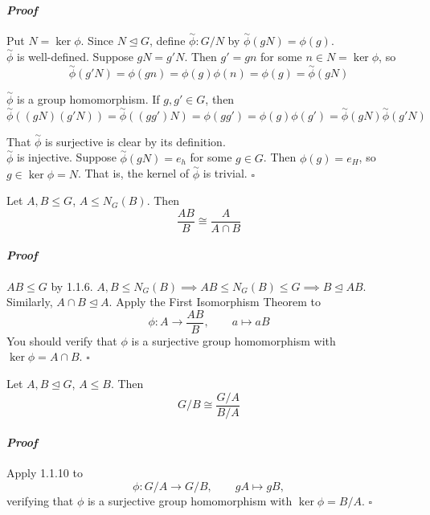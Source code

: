 \documentclass[11pt]{book}
\theoremstyle{definition}   \newtheorem{defn}[counter]{Definition} %
\newcommand{\nsg}{\mathrel{\unlhd}}   \newcommand{\ind}{\parindent24pt}   \newcommand{\vn}{\varnothing}
\DeclareMathOperator{\ra}{\rightarrow}   \DeclareMathOperator{\Poly}{\mathbf{P}}   \DeclareMathOperator{\spn}{\textnormal{span}}   \DeclareMathOperator{\aut}{\textnormal{Aut}}
\newenvironment{prf}{\paragraph{\textit{Proof}}}{\hfill$\square$}
\newcommand{\vs}{\vspace{8pt}}
\numberwithin{counter}{chapter}
\begin{document}
\begin{prf}
Put $N = \ker \phi$. Since $N \nsg G$, define $\overset{\sim}{\phi} : G/ N$ by $\overset{\sim}{\phi} (gN) = \phi(g)$. \\

$\overset{\sim}{\phi}$ is well-defined. Suppose $gN = g'N$. Then $g' = gn$ for some $n \in N = \ker \phi$, so
	\[\overset{\sim}{\phi}(g'N) = \phi(gn) = \phi(g)\phi(n) = \phi(g) = \overset{\sim}{\phi}(gN) \]

$\overset{\sim}{\phi}$ is a group homomorphism. If $g,g' \in G$, then
	\[\overset{\sim}{\phi}((gN)(g'N)) = \overset{\sim}{\phi}((gg')N) = \phi(gg') = \phi(g)\phi(g') = \overset{\sim}{\phi}(gN) \overset{\sim}{\phi}(g'N) \]

That $\overset{\sim}{\phi}$ is surjective is clear by its definition. \\

$\overset{\sim}{\phi}$ is injective. Suppose $\overset{\sim}{\phi}(gN) = e_h$ for some $g \in G$. Then $\phi(g) = e_H$, so $g \in \ker \phi = N$. That is, the kernel of $\overset{\sim}{\phi}$ is trivial.
\end{prf}

\vs

\begin{corollary}
Let $A,B \leq G$, $A \leq N_G(B)$. Then
	\[\frac{AB}{B} \cong \frac{A}{A\cap B} \]
\end{corollary}

\begin{prf}
$AB \leq G$ by 1.1.6. $A,B \leq N_G(B) \implies AB \leq N_G(B) \leq G \implies B \nsg AB$. Similarly, $A \cap B \nsg A$. Apply the First Isomorphism Theorem to
	\[\phi : A \ra \frac{AB}{B}, \qquad a \mapsto aB \]
You should verify that $\phi$ is a surjective group homomorphism with $\ker \phi = A \cap B$.
\end{prf}

\vs

\begin{corollary}
Let $A,B \nsg G$, $A \leq B$. Then
	\[G/B \cong \frac{G/A}{B/A} \]
\end{corollary}

\begin{prf}
Apply 1.1.10 to
	\[\phi : G/A \ra G/B, \qquad gA \mapsto gB, \]
verifying that $\phi$ is a surjective group homomorphism with $\ker \phi = B/A $.
\end{prf}

\vs
\end{document}
